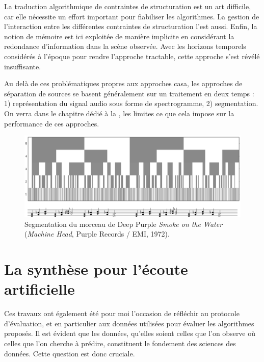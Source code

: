   La traduction algorithmique de contraintes de structuration est un art difficile, car elle nécessite un effort important pour fiabiliser les algorithmes. La gestion de l'interaction entre les différentes contraintes de structuration l'est aussi. Enfin, la notion de mémoire est ici exploitée de manière implicite en considérant la redondance d'information dans la scène observée. Avec les horizons temporels considérés à l'époque pour rendre l'approche tractable, cette approche s'est révélé insuffisante.



  Au delà de ces problématiques propres aux approches casa, les approches de séparation de sources se basent généralement sur un traitement en deux temps : 1) représentation du signal audio sous forme de spectrogramme, 2) segmentation. On verra dans le chapitre dédié à la , les limites ce que cela impose sur la performance de ces approches.

  \begin{figure}[t]
    \includegraphics[width=\textwidth]{figures/smokeCrop}
    \caption{Segmentation du morceau de Deep Purple \emph{Smoke on the Water} (\emph{Machine Head}, Purple Records / EMI, 1972).}  \label{fig:smoke}
  \end{figure}

  \section{ \nmu La  synthèse pour l'écoute artificielle} \label{sec:dcase}

  Ces travaux ont également été pour moi l'occasion de réfléchir au protocole d'évaluation, et en particulier aux données utilisées pour évaluer les algorithmes proposés. Il est évident que les données, qu'elles soient celles que l'on observe où celles que l'on cherche à prédire, constituent le fondement des sciences des données. Cette question est donc cruciale.

